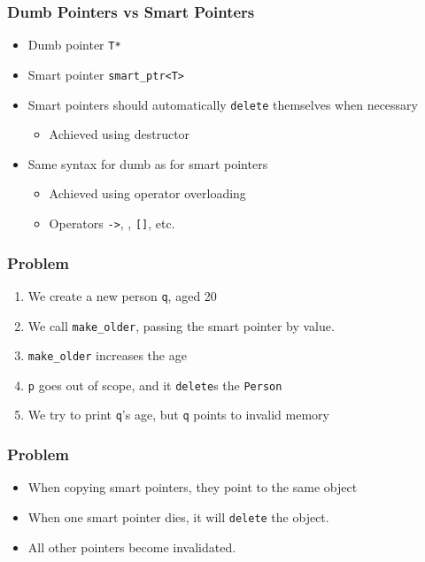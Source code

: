 \documentclass{../ucll-slides}
\begin{document}
\begin{frame}
  \frametitle{Dumb Pointers vs Smart Pointers}
  \begin{itemize}
    \item Dumb pointer {\tt T*}
    \item Smart pointer {\tt smart\_ptr<T>}
    \item Smart pointers should automatically {\tt delete} themselves when necessary
          \begin{itemize}
            \item Achieved using destructor
          \end{itemize}
    \item Same syntax for dumb as for smart pointers
          \begin{itemize}
            \item Achieved using operator overloading
            \item Operators {\tt ->}, {\tt *}, {\tt []}, etc.
          \end{itemize}
  \end{itemize}
\end{frame}

\begin{frame}
  \frametitle{Problem}
  \begin{enumerate}
    \item We create a new person {\tt q}, aged 20
    \item We call {\tt make\_older}, passing the smart pointer by value.
    \item {\tt make\_older} increases the age
    \item {\tt p} goes out of scope, and it {\tt delete}s the {\tt Person}
    \item We try to print {\tt q}'s age, but {\tt q} points to invalid memory
  \end{enumerate}
\end{frame}

\begin{frame}
  \frametitle{Problem}
  \begin{center}
  \end{center}
  \begin{itemize}
    \item When copying smart pointers, they point to the same object
    \item When one smart pointer dies, it will {\tt delete} the object.
    \item All other pointers become invalidated.      
  \end{itemize}
\end{frame}
\end{document}
